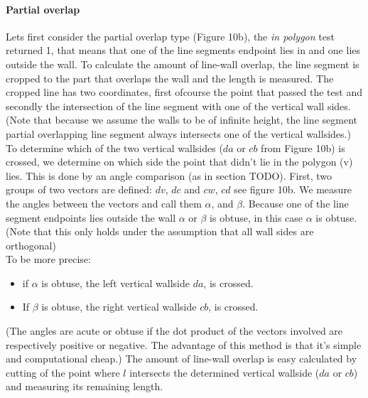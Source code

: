 \documentclass[10pt]{article}
\begin{document}
	\paragraph{Partial overlap}
	Lets first consider the partial overlap type (Figure 10b), the \emph{in polygon} test
	returned 1, that means that one of the line segments endpoint lies in
	and one lies outside the wall.
	To calculate the amount of line-wall overlap, the line segment is cropped to the
	part that overlaps the wall and the length is measured. 
	The cropped line has two coordinates, first ofcourse the point that passed
	the  test and secondly the intersection of the line
	segment with one of the vertical wall sides.
	(Note that because we assume the walls to be of infinite height, the line
	segment partial overlapping line segment always intersects one of the
	vertical wallsides.)
	To determine which of the two vertical wallsides ($da$ or $cb$ from Figure 10b)
	 is crossed, we determine on which side the point that didn't lie in the polygon (v) lies.
	This is done by an angle comparison (as in section TODO).
	First, two groups of two vectors are defined: $dv$, $dc$ and $cw$, $cd$ see figure 10b.
	We measure the angles between the vectors and call them $\alpha$, and
	$\beta$. 
	Because one of the line segment endpoints lies outside
	the wall $\alpha$ or $\beta$ is obtuse, in this case $\alpha$ is obtuse.
	(Note that this only holds under the assumption that all wall sides are orthogonal)\\
	To be more precise: 
	\begin{itemize}
	\item if $\alpha$ is obtuse, the left vertical wallside $da$, is
	crossed. \\
	\item If $\beta$ is obtuse, the right vertical wallside $cb$, is
	crossed. \\
	\end{itemize}
	(The angles are acute or obtuse if the dot product of the vectors involved
	are respectively positive or negative. The advantage of this method is that
	it's simple and computational cheap.)
	The amount of line-wall overlap is easy calculated by cutting of the
	point where $l$ intersects the determined vertical wallside ($da$ or
	$cb$) and measuring its remaining length.
\end{document}
